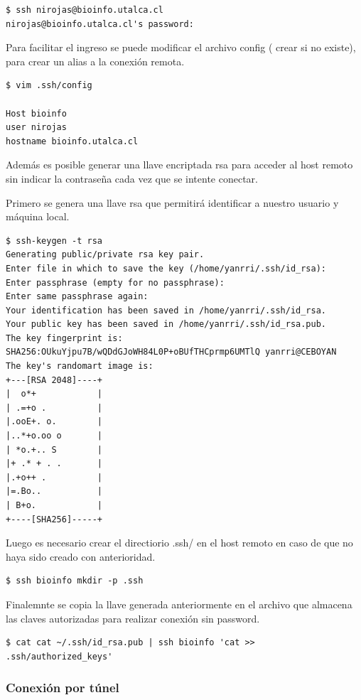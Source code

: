 \documentclass[12pt]{article}
\begin{document}
\begin{lstlisting}[frame=single]
$ ssh nirojas@bioinfo.utalca.cl
nirojas@bioinfo.utalca.cl's password:
\end{lstlisting}

Para facilitar el ingreso se puede modificar el archivo config ( crear si no existe), para crear un alias a la conexión remota.
\begin{lstlisting}[frame=single]
$ vim .ssh/config

Host bioinfo
user nirojas
hostname bioinfo.utalca.cl
\end{lstlisting}

Además es posible generar una llave encriptada rsa para acceder al host remoto sin indicar la contraseña cada vez que se intente conectar.

Primero se genera una llave rsa que permitirá identificar a nuestro usuario y máquina local.

\begin{lstlisting}[frame=single]
$ ssh-keygen -t rsa
Generating public/private rsa key pair.
Enter file in which to save the key (/home/yanrri/.ssh/id_rsa): 
Enter passphrase (empty for no passphrase): 
Enter same passphrase again: 
Your identification has been saved in /home/yanrri/.ssh/id_rsa.
Your public key has been saved in /home/yanrri/.ssh/id_rsa.pub.
The key fingerprint is:
SHA256:OUkuYjpu7B/wQDdGJoWH84L0P+oBUfTHCprmp6UMTlQ yanrri@CEBOYAN
The key's randomart image is:
+---[RSA 2048]----+
|  o*+            |
| .=+o .          |
|.ooE+. o.        |
|..*+o.oo o       |
| *o.+.. S        |
|+ .* + . .       |
|.+o++ .          |
|=.Bo..           |
| B+o.            |
+----[SHA256]-----+
\end{lstlisting}
  
Luego es necesario crear el directiorio .ssh/ en el host remoto en caso de que no haya sido creado con anterioridad.

\begin{lstlisting}[frame=single]
$ ssh bioinfo mkdir -p .ssh
\end{lstlisting}


Finalemnte se copia la llave generada anteriormente en el archivo que almacena las claves autorizadas para realizar conexión sin password. 
\begin{lstlisting}[frame=single]
$ cat cat ~/.ssh/id_rsa.pub | ssh bioinfo 'cat >> .ssh/authorized_keys'
\end{lstlisting}

\subsubsection{Conexión por túnel}
\end{document}
